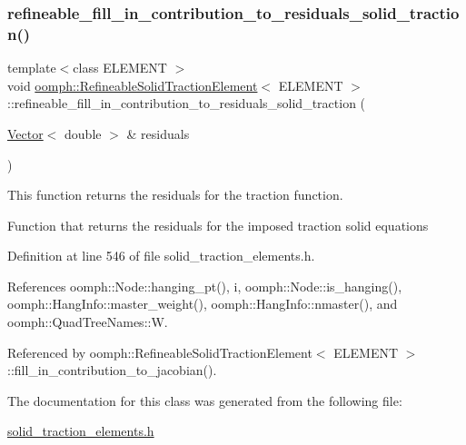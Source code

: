 \subsubsection{\texorpdfstring{refineable\+\_\+fill\+\_\+in\+\_\+contribution\+\_\+to\+\_\+residuals\+\_\+solid\+\_\+traction()}{refineable\_fill\_in\_contribution\_to\_residuals\_solid\_traction()}}
{\footnotesize\ttfamily template$<$class E\+L\+E\+M\+E\+NT $>$ \\
void \hyperlink{classoomph_1_1RefineableSolidTractionElement}{oomph\+::\+Refineable\+Solid\+Traction\+Element}$<$ E\+L\+E\+M\+E\+NT $>$\+::refineable\+\_\+fill\+\_\+in\+\_\+contribution\+\_\+to\+\_\+residuals\+\_\+solid\+\_\+traction (\begin{DoxyParamCaption}\item[{\hyperlink{classoomph_1_1Vector}{Vector}$<$ double $>$ \&}]{residuals }\end{DoxyParamCaption})\hspace{0.3cm}{\ttfamily [protected]}}



This function returns the residuals for the traction function. 

Function that returns the residuals for the imposed traction solid equations 

Definition at line 546 of file solid\+\_\+traction\+\_\+elements.\+h.



References oomph\+::\+Node\+::hanging\+\_\+pt(), i, oomph\+::\+Node\+::is\+\_\+hanging(), oomph\+::\+Hang\+Info\+::master\+\_\+weight(), oomph\+::\+Hang\+Info\+::nmaster(), and oomph\+::\+Quad\+Tree\+Names\+::W.



Referenced by oomph\+::\+Refineable\+Solid\+Traction\+Element$<$ E\+L\+E\+M\+E\+N\+T $>$\+::fill\+\_\+in\+\_\+contribution\+\_\+to\+\_\+jacobian().



The documentation for this class was generated from the following file\+:\begin{DoxyCompactItemize}
\item 
\hyperlink{solid__traction__elements_8h}{solid\+\_\+traction\+\_\+elements.\+h}\end{DoxyCompactItemize}
